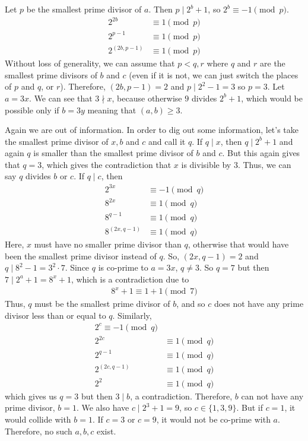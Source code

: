 \documentclass[problems.tex]{subfile}
\begin{document}
	\begin{solution}
		Let $p$ be the smallest prime divisor of $a$. Then $p\mid 2^b+1$, so $2^b\equiv-1\pmod p$.
			\begin{align*}
				2^{2b} & \equiv1\pmod p\\
				2^{p-1}& \equiv1\pmod p\\
				2^{(2b,p-1)}&\equiv1\pmod p
			\end{align*}
		Without loss of generality, we can assume that $p<q,r$ where $q$ and $r$  are the smallest prime divisors of $b$ and $c$ (even if it is not, we can just switch the places of $p$ and $q$, or $r$). Therefore, $(2b,p-1)=2$ and $p\mid 2^2-1=3$ so $p=3$. Let $a=3x$. We can see that $3\nmid x$, because otherwise $9$ divides $2^b+1$, which would be possible only if $b=3y$ meaning that $(a,b)\geq3$.

		Again we are out of information. In order to dig out some information, let's take the smallest prime divisor of $x,b$ and $c$ and call it $q$. If $q\mid x$, then $q\mid 2^b+1$ and again $q$ is smaller than the smallest prime divisor of $b$ and $c$. But this again gives that $q=3$, which gives the contradiction that $x$ is divisible by $3$. Thus, we can say $q$ divides $b$ or $c$. If $q\mid c$, then
			\begin{align*}
				2^{3x} & \equiv-1\pmod q\\
				8^{2x} & \equiv1\pmod q\\
				8^{q-1}& \equiv1\pmod q\\
				8^{(2x,q-1)}&\equiv1\pmod q
			\end{align*}
		Here, $x$ must have no smaller prime divisor than $q$, otherwise that would have been the smallest prime divisor instead of $q$. So, $(2x,q-1)=2$ and $q\mid 8^2-1=3^2\cdot7$. Since $q$ is co-prime to $a=3x$, $q\neq3$. So $q=7$ but then $7\mid 2^a+1=8^x+1$, which is a contradiction due to
			\begin{align*}
				8^x+1\equiv1+1\pmod7
			\end{align*}
		Thus, $q$ must be the smallest prime divisor of $b$, and so $c$ does not have any prime divisor less than or equal to $q$. Similarly,
			\begin{align*}
				2^c\equiv-1\pmod q\\
				2^{2c}&\equiv1\pmod q\\
				2^{q-1}&\equiv1\pmod q\\
				2^{(2c,q-1)}&\equiv1\pmod q\\
				2^2&\equiv1\pmod q
			\end{align*}
		which gives us $q=3$ but then $3\mid b$, a contradiction. Therefore, $b$ can not have any prime divisor, $b=1$. We also have $c\mid 2^3+1=9$, so $c\in\{1,3,9\}$. But if $c=1$, it would collide with $b=1$. If $c=3$ or $c=9$, it would not be co-prime with $a$. Therefore, no such $a,b,c$ exist.
	\end{solution}
\end{document}
